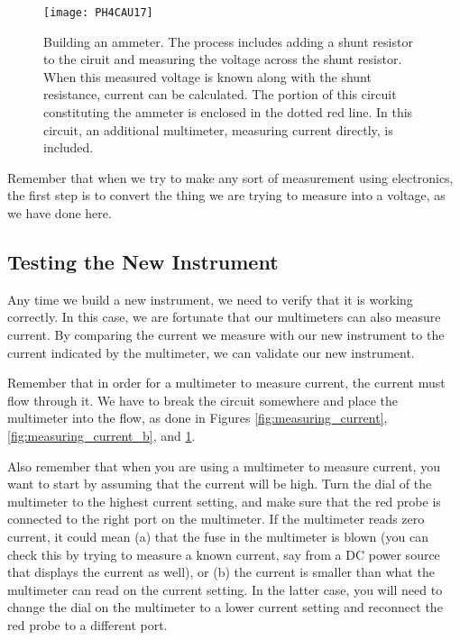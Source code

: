 \begin{figure}[htbp!]
\centering
\texttt{[image: PH4CAU17]}
\caption[Building an ammeter]{Building an ammeter. The process includes
adding a shunt resistor to the ciruit and measuring the voltage across the
shunt resistor. When this measured voltage is known along with the 
shunt resistance, current can be calculated. The portion of this circuit
constituting the ammeter is enclosed in the dotted red line. In this 
circuit, an additional multimeter, measuring current directly, is 
included.}
\label{fig:ammeter_construction}
\end{figure}

Remember that when we try to make any sort of measurement using electronics,
the first step is to convert the thing we are trying to measure into a 
voltage, as we have done here.

\subsection{Testing the New Instrument}

Any time we build a new instrument, we need to verify that it is working
correctly. In this case, we are fortunate that our multimeters can also measure
current. By comparing the current we measure with our new instrument to the 
current indicated by the multimeter, we can validate our new instrument.

Remember that in order for a multimeter to measure current, the current must
flow through it. We have to break the circuit somewhere and place the
multimeter into the flow, as done in Figures \ref{fig:measuring_current},
\ref{fig:measuring_current_b}, and
\ref{fig:ammeter_construction}.

Also remember that when you are using a multimeter to measure current, you
want to start by assuming that the current will be high. Turn the dial of 
the multimeter to the highest current setting, and make sure that the red
probe is connected to the right port on the multimeter. If the multimeter 
reads zero current, it could mean (a) that the fuse in the multimeter is blown
(you can check this by trying to measure a known current, say from a DC power
source that displays the current as well), or (b) the current is smaller than
what the multimeter can read on the current setting. In the latter case, you
will need to change the dial on the multimeter to a lower current setting and
reconnect the red probe to a different port.

